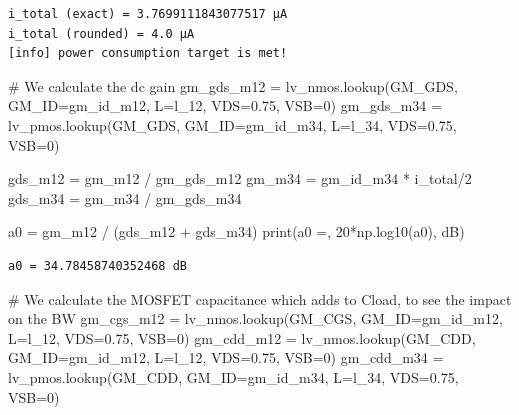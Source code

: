 \documentclass[
  a4paper,
  DIV=11,
  numbers=noendperiod]{scrartcl}
\newenvironment{Shaded}{\begin{snugshade}}{\end{snugshade}}
\newcommand{\BuiltInTok}[1]{\textcolor[rgb]{0.00,0.23,0.31}{#1}}
\newcommand{\CommentTok}[1]{\textcolor[rgb]{0.37,0.37,0.37}{#1}}
\newcommand{\DecValTok}[1]{\textcolor[rgb]{0.68,0.00,0.00}{#1}}
\newcommand{\FloatTok}[1]{\textcolor[rgb]{0.68,0.00,0.00}{#1}}
\newcommand{\NormalTok}[1]{\textcolor[rgb]{0.00,0.23,0.31}{#1}}
\newcommand{\OperatorTok}[1]{\textcolor[rgb]{0.37,0.37,0.37}{#1}}
\newcommand{\StringTok}[1]{\textcolor[rgb]{0.13,0.47,0.30}{#1}}
\begin{document}
\begin{tcolorbox}
\begin{verbatim}
i_total (exact) = 3.7699111843077517 µA
i_total (rounded) = 4.0 µA
[info] power consumption target is met!
\end{verbatim}

\begin{Shaded}
\begin{Highlighting}[]
\CommentTok{\# We calculate the dc gain}
\NormalTok{gm\_gds\_m12 }\OperatorTok{=}\NormalTok{ lv\_nmos.lookup(}\StringTok{\textquotesingle{}GM\_GDS\textquotesingle{}}\NormalTok{, GM\_ID}\OperatorTok{=}\NormalTok{gm\_id\_m12, L}\OperatorTok{=}\NormalTok{l\_12, VDS}\OperatorTok{=}\FloatTok{0.75}\NormalTok{, VSB}\OperatorTok{=}\DecValTok{0}\NormalTok{)}
\NormalTok{gm\_gds\_m34 }\OperatorTok{=}\NormalTok{ lv\_pmos.lookup(}\StringTok{\textquotesingle{}GM\_GDS\textquotesingle{}}\NormalTok{, GM\_ID}\OperatorTok{=}\NormalTok{gm\_id\_m34, L}\OperatorTok{=}\NormalTok{l\_34, VDS}\OperatorTok{=}\FloatTok{0.75}\NormalTok{, VSB}\OperatorTok{=}\DecValTok{0}\NormalTok{)}

\NormalTok{gds\_m12 }\OperatorTok{=}\NormalTok{ gm\_m12 }\OperatorTok{/}\NormalTok{ gm\_gds\_m12}
\NormalTok{gm\_m34 }\OperatorTok{=}\NormalTok{ gm\_id\_m34 }\OperatorTok{*}\NormalTok{ i\_total}\OperatorTok{/}\DecValTok{2}
\NormalTok{gds\_m34 }\OperatorTok{=}\NormalTok{ gm\_m34 }\OperatorTok{/}\NormalTok{ gm\_gds\_m34}

\NormalTok{a0 }\OperatorTok{=}\NormalTok{ gm\_m12 }\OperatorTok{/}\NormalTok{ (gds\_m12 }\OperatorTok{+}\NormalTok{ gds\_m34)}
\BuiltInTok{print}\NormalTok{(}\StringTok{\textquotesingle{}a0 =\textquotesingle{}}\NormalTok{, }\DecValTok{20}\OperatorTok{*}\NormalTok{np.log10(a0), }\StringTok{\textquotesingle{}dB\textquotesingle{}}\NormalTok{)}
\end{Highlighting}
\end{Shaded}

\begin{verbatim}
a0 = 34.78458740352468 dB
\end{verbatim}

\begin{Shaded}
\begin{Highlighting}[]
\CommentTok{\# We calculate the MOSFET capacitance which adds to Cload, to see the impact on the BW}
\NormalTok{gm\_cgs\_m12 }\OperatorTok{=}\NormalTok{ lv\_nmos.lookup(}\StringTok{\textquotesingle{}GM\_CGS\textquotesingle{}}\NormalTok{, GM\_ID}\OperatorTok{=}\NormalTok{gm\_id\_m12, L}\OperatorTok{=}\NormalTok{l\_12, VDS}\OperatorTok{=}\FloatTok{0.75}\NormalTok{, VSB}\OperatorTok{=}\DecValTok{0}\NormalTok{)}
\NormalTok{gm\_cdd\_m12 }\OperatorTok{=}\NormalTok{ lv\_nmos.lookup(}\StringTok{\textquotesingle{}GM\_CDD\textquotesingle{}}\NormalTok{, GM\_ID}\OperatorTok{=}\NormalTok{gm\_id\_m12, L}\OperatorTok{=}\NormalTok{l\_12, VDS}\OperatorTok{=}\FloatTok{0.75}\NormalTok{, VSB}\OperatorTok{=}\DecValTok{0}\NormalTok{)}
\NormalTok{gm\_cdd\_m34 }\OperatorTok{=}\NormalTok{ lv\_pmos.lookup(}\StringTok{\textquotesingle{}GM\_CDD\textquotesingle{}}\NormalTok{, GM\_ID}\OperatorTok{=}\NormalTok{gm\_id\_m34, L}\OperatorTok{=}\NormalTok{l\_34, VDS}\OperatorTok{=}\FloatTok{0.75}\NormalTok{, VSB}\OperatorTok{=}\DecValTok{0}\NormalTok{)}


\end{Highlighting}
\end{Shaded}
\end{tcolorbox}
\end{document}
